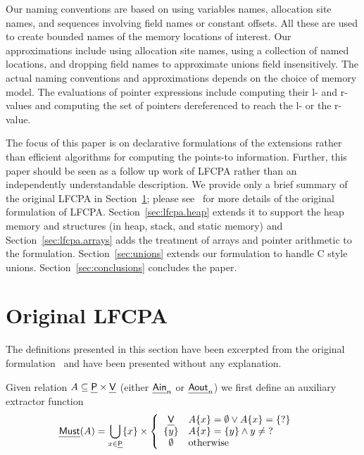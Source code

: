 \documentclass[a4paper,11pt,fleqn]{article}
\newcommand{\var}{\text{\sf\em V\/}\xspace}
\newcommand{\pointer}{\text{\sf\em P\/}\xspace}
\newcommand{\ain}{\text{{\sf\em Ain\/}}\xspace}
\newcommand{\aout}{\text{{\sf\em Aout\/}}\xspace}
\newcommand{\must}{\text{\sf\em Must\/}\xspace}
\begin{document}
Our naming conventions are based on using variables names, allocation site names, and sequences
involving field names or constant offsets. All these are used to create bounded names
of the memory locations of interest. Our approximations include
using allocation site names, using a collection
of named locations, and dropping field names to approximate unions field insensitively.
The actual naming conventions and approximations depends on the choice of memory model.
The evaluations of pointer expressions
include computing their l- and r-values and computing the set of pointers dereferenced to 
reach the l- or the r-value. 



The focus of this paper is on declarative formulations of the
extensions rather than efficient algorithms for computing the points-to
information. Further, this paper should be seen as a follow up work of LFCPA rather than
an independently understandable description. We provide only a brief
summary of the original LFCPA in Section~\ref{sec:original.lfcpa};
please see~\cite{lfcpa} for more details of the original formulation
of LFCPA. Section~\ref{sec:lfcpa.heap} extends it to support the
heap memory and structures (in heap, stack, and static memory) and
Section~\ref{sec:lfcpa.arrays} adds the treatment of arrays and pointer
arithmetic to the formulation. Section~\ref{sec:unions} extends our
formulation to handle C style unions. Section~\ref{sec:conclusions}
concludes the paper.


\section{Original LFCPA}
\label{sec:original.lfcpa}

The definitions presented in this section have been excerpted from the original formulation~\cite{lfcpa}
and have been presented without any explanation.

Given relation $A\subseteq \pointer\times\var$ (either $\ain_n$ or
$\aout_n$) we first define an auxiliary extractor function
\begin{align}
  \must(A) & 
	= \bigcup_{x\in \pointer} \{x\} \times
  \left\{\begin{array}{c@{\hspace{1em}}l}
     \var & A\{x\} = \emptyset \vee A\{x\} = \{?\}           \\
     \{y\} & A\{x\} = \{ y \} \wedge y \neq \mbox{?}                \\
     \emptyset & \mbox{otherwise}
  \end{array}\right.
	\label{eq:must.new.def}
\end{align}
\end{document}
